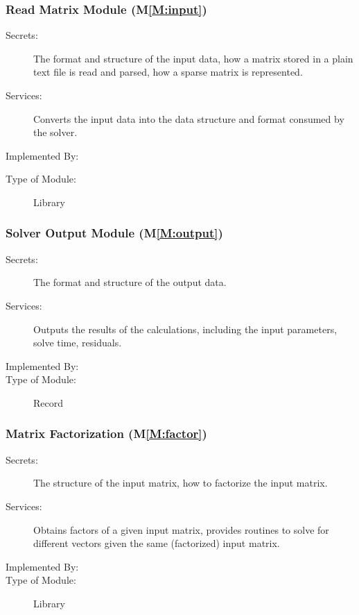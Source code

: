 \documentclass[12pt, titlepage]{article}
\newcommand{\mref}[1]{M\ref{#1}}
\begin{document}
\subsubsection{Read Matrix Module (\mref{M:input})}

\begin{description}
\item[Secrets:] The format and structure of the input data, how a matrix stored in
  a plain text file is read and parsed, how a sparse matrix is represented.
\item[Services:] Converts the input data into the data structure and format
  consumed by the solver.
\item[Implemented By:] \cite{noauthor_gsl_nodate}
\item[Type of Module:] Library
\end{description}

\subsubsection{Solver Output Module (\mref{M:output})}

\begin{description}
\item[Secrets:] The format and structure of the output data.
\item[Services:] Outputs the results of the calculations, including the input
  parameters, solve time, residuals.
\item[Implemented By:] \progname{}
\item[Type of Module:] Record
\end{description}

\subsubsection{Matrix Factorization (\mref{M:factor})}

\begin{description}
\item[Secrets:] The structure of the input matrix, how to factorize the input
  matrix.
\item[Services:] Obtains factors of a given input matrix, provides routines to
  solve for different vectors given the same (factorized) input matrix.
\item[Implemented By:] \progname{}
\item[Type of Module:] Library
\end{description}
\end{document}
